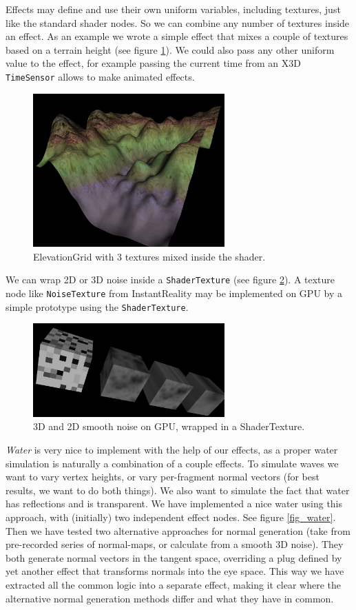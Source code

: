 \documentclass{egpubl}
\begin{document}
Effects may define and use their own uniform variables, including textures,
just like the standard shader nodes. So we can combine any number of textures
inside an effect. As an example we wrote a simple effect that mixes a couple of
textures based on a terrain height (see figure \ref{fig_terrain}).
We could also pass any other uniform value to the effect, for example
passing the current time from an X3D \texttt{TimeSensor} allows to make
animated effects.

\begin{figure}[H]
  \centering
  \includegraphics[width=2.9in]{terrain}
  \caption{ElevationGrid with 3 textures mixed inside the shader.}
  \label{fig_terrain}
\end{figure}

We can wrap 2D or 3D noise inside a \texttt{ShaderTexture}
(see figure \ref{fig_noise}).
A texture node like \texttt{NoiseTexture} from InstantReality
\cite{instant:noisetex}
may be implemented on GPU by a simple prototype using the \texttt{ShaderTexture}.

\begin{figure}[H]
  \centering
  \includegraphics[width=2.9in]{noise-cropped}
  \caption{3D and 2D smooth noise on GPU, wrapped in a ShaderTexture.}
  \label{fig_noise}
\end{figure}

\emph{Water} is very nice to implement with the help of our effects,
as a proper water simulation
is naturally a combination of a couple effects.
To simulate waves we want to vary vertex
heights, or vary per-fragment normal vectors (for best results,
we want to do both things).
We also want to simulate the fact that water has reflections and
is transparent. We have implemented a nice water using this approach,
with (initially) two independent effect nodes. See figure \ref{fig_water}.
Then we have tested two alternative
approaches for normal generation (take from pre-recorded series of normal-maps,
or calculate from a smooth 3D noise). They both generate normal
vectors in the tangent space, overriding a plug defined by yet another effect
that transforms normals into the eye space.
This way we have extracted all the common logic into a separate effect,
making it clear where the alternative normal generation methods differ
and what they have in common.
\end{document}
